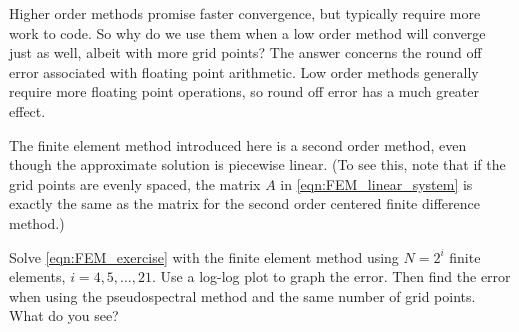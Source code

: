 \begin{problem}
\label{prob:FEM_accuracy_comparison}
Higher order methods promise faster convergence, but typically require more work to code.
So why do we use them when a low order method will converge just as well, albeit with more grid points?
The answer concerns the round off error associated with floating point arithmetic.
Low order methods generally require more floating point operations, so round off error has a much greater effect.

The finite element method introduced here is a second order method, even though the approximate solution is piecewise linear.
(To see this, note that if the grid points are evenly spaced, the matrix $A$ in \eqref{eqn:FEM_linear_system} is exactly the same as the matrix for the second order centered finite difference method.)

Solve \eqref{eqn:FEM_exercise} with the finite element method using $N = 2^i$  finite elements, $i = 4, 5, \ldots, 21$.
Use a log-log plot to graph the error.
Then find the error when using the pseudospectral method and the same number of grid points.
What do you see?
\end{problem}


